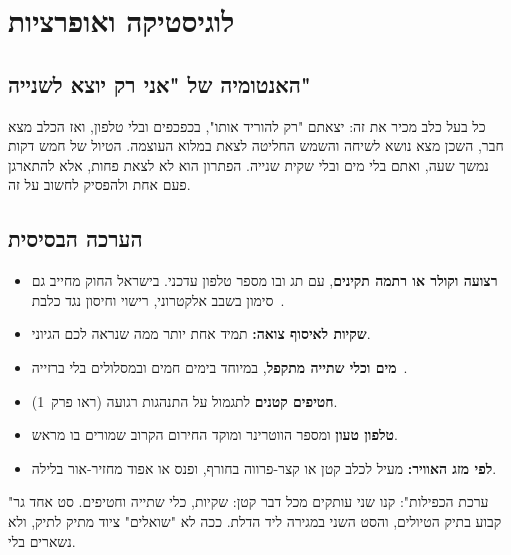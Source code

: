 \chapter{לוגיסטיקה ואופרציות}

\section{האנטומיה של "אני רק יוצא לשנייה"}
כל בעל כלב מכיר את זה: יצאתם "רק להוריד אותו", בכפכפים ובלי טלפון, ואז הכלב מצא חבר, השכן
מצא נושא לשיחה והשמש החליטה לצאת במלוא העוצמה. הטיול של חמש דקות נמשך שעה, ואתם בלי מים ובלי
שקית שנייה. הפתרון הוא לא לצאת פחות, אלא להתארגן פעם אחת ולהפסיק לחשוב על זה.

\section{הערכה הבסיסית}
\begin{tcolorbox}[enhanced,colback=white,colframe=navy,arc=3mm,boxrule=0.8pt,
   title={\sffamily\bfseries\paw[white]\enspace רשימת ציוד קבועה ליד הדלת},colbacktitle=navy,
   left=8pt,right=8pt]
\begin{itemize}[label={\color{sagedark}$\square$}]
  \item \textbf{רצועה וקולר או רתמה תקינים}, עם תג ובו מספר טלפון עדכני. בישראל החוק מחייב גם
        סימון בשבב אלקטרוני, רישוי וחיסון נגד כלבת~\cite{il-doglaw2002}.
  \item \textbf{שקיות לאיסוף צואה:} תמיד אחת יותר ממה שנראה לכם הגיוני.
  \item \textbf{מים וכלי שתייה מתקפל}, במיוחד בימים חמים ובמסלולים בלי ברזייה~\cite{humane-heat}.
  \item \textbf{חטיפים קטנים} לתגמול על התנהגות רגועה (ראו פרק~1).
  \item \textbf{טלפון טעון} ומספר הווטרינר ומוקד החירום הקרוב שמורים בו מראש.
  \item \textbf{לפי מזג האוויר:} מעיל לכלב קטן או קצר-פרווה בחורף, ופנס או אפוד מחזיר-אור בלילה.
\end{itemize}
\end{tcolorbox}

\begin{fieldbox}
"ערכת הכפילות": קנו שני עותקים מכל דבר קטן: שקיות, כלי שתייה וחטיפים. סט אחד גר קבוע בתיק הטיולים, והסט השני
במגירה ליד הדלת. ככה לא "שואלים" ציוד מתיק לתיק, ולא נשארים בלי.
\end{fieldbox}

